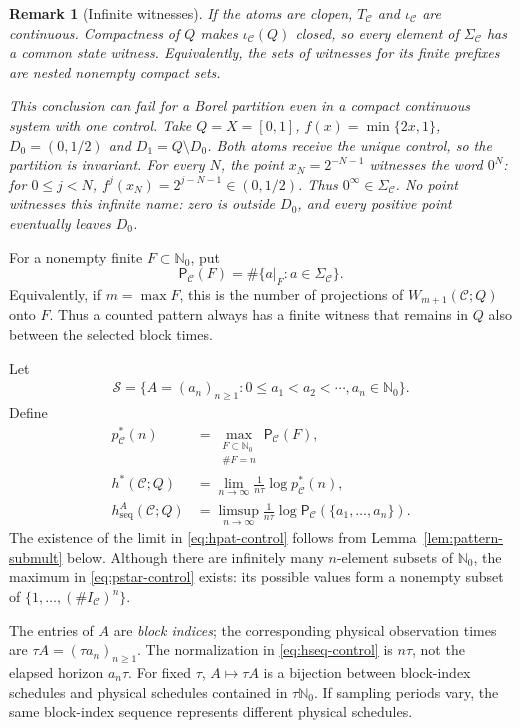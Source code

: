 \documentclass[11pt,reqno]{amsart}
\numberwithin{equation}{section}
\newtheorem{remark}[theorem]{Remark}
\theoremstyle{definition}
\newcommand{\Nzero}{\mathbb N_0}
\newcommand{\C}{\mathcal C}
\newcommand{\Patt}{\mathsf P}
\newcommand{\hseq}{h_{\mathrm{seq}}}
\newcommand{\hpat}{h^{*}}
\begin{document}
\begin{remark}[Infinite witnesses]\label{rem:witness}
If the atoms are clopen, $T_\C$ and $\iota_\C$ are continuous.
Compactness of $Q$ makes $\iota_\C(Q)$ closed, so every element of
$\Sigma_\C$ has a common state witness. Equivalently, the sets of witnesses
for its finite prefixes are nested nonempty compact sets.

This conclusion can fail for a Borel partition even in a compact
continuous system with one control. Take $Q=X=[0,1]$,
$f(x)=\min\{2x,1\}$, $D_0=(0,1/2)$ and $D_1=Q\setminus D_0$.
Both atoms receive the unique control, so the partition is invariant.
For every $N$, the point $x_N=2^{-N-1}$ witnesses the word $0^N$:
for $0\le j<N$, $f^j(x_N)=2^{j-N-1}\in(0,1/2)$.
Thus $0^\infty\in\Sigma_\C$. No point witnesses this infinite name:
zero is outside $D_0$, and every positive point eventually leaves $D_0$.
\end{remark}

For a nonempty finite $F\subset\Nzero$, put
\begin{equation}\label{eq:control-pattern-count}
 \Patt_\C(F)=\#\{a|_F:a\in\Sigma_\C\}.
\end{equation}
Equivalently, if $m=\max F$, this is the number of projections of
$W_{m+1}(\C;Q)$ onto $F$.  Thus a counted pattern always has a finite witness
that remains in $Q$ also between the selected block times.

Let
\begin{align*}
 \mathscr S=\{A=(a_n)_{n\ge1}:0\le a_1<a_2<\cdots, a_n\in\Nzero\}.
\end{align*}
Define
\begin{align}
 p_\C^*(n)&=\max_{\substack{F\subset\Nzero\\\#F=n}}\Patt_\C(F),
 \label{eq:pstar-control}\\
 \hpat(\C;Q)&=\lim_{n\to\infty}\frac1{n\tau}\log p_\C^*(n),
 \label{eq:hpat-control}\\
 \hseq^A(\C;Q)&=\limsup_{n\to\infty}\frac1{n\tau}
 \log\Patt_\C(\{a_1,\ldots,a_n\}).
 \label{eq:hseq-control}
\end{align}
The existence of the limit in \eqref{eq:hpat-control} follows from
Lemma~\ref{lem:pattern-submult} below.  Although there are infinitely many
$n$-element subsets of $\Nzero$, the maximum in \eqref{eq:pstar-control}
exists: its possible values form a nonempty subset of
$\{1,\ldots,(\#I_\C)^n\}$.

The entries of $A$ are \emph{block indices}; the corresponding physical
observation times are $\tau A=(\tau a_n)_{n\ge1}$.  The normalization in
\eqref{eq:hseq-control} is $n\tau$, not the elapsed horizon $a_n\tau$.
For fixed $\tau$, $A\mapsto\tau A$ is a bijection between block-index
schedules and physical schedules contained in $\tau\Nzero$.  If sampling
periods vary, the same block-index sequence represents different physical
schedules.
\end{document}
